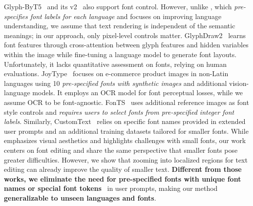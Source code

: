 Glyph-ByT5~\cite{liu2025glyph} and its v2~\cite{liu2024glyph} also support font control. However, unlike \cite{liu2025glyph}, which \textit{pre-specifies font labels for each language} and focuses on improving language understanding, we assume that text rendering is independent of the semantic meanings; in our approach, only pixel-level controls matter.
GlyphDraw2~\cite{ma2024glyphdraw2} learns font features through cross-attention between glyph features and hidden variables within the image while fine-tuning a language model to generate font layouts. Unfortunately, it lacks quantitative assessment on fonts, relying on human evaluations. 
JoyType~\cite{li2024joytype} focuses on e-commerce product images in non-Latin languages using 10 \textit{pre-specified fonts with synthetic images} and additional vision-language models. It employs an OCR model for font perceptual losses, while we assume OCR to be font-agnostic.
FonTS~\cite{shi2024fonts} uses additional reference images as font style controls and \textit{requires users to select fonts from pre-specified integer font labels}. Similarly, CustomText~\cite{paliwal2024customtext} relies on specific font names provided in extended user prompts and an additional training datasets tailored for smaller fonts.
While \citet{liu2024glyph} emphasizes visual aesthetics and highlights challenges with small fonts, our work centers on font editing and share the same perspective that smaller fonts pose greater difficulties. However, we show that zooming into localized regions for text editing can already improve the quality of smaller text.
\textbf{Different from those works, we eliminate the need for pre-specified fonts with unique font names or special font tokens}~\cite{liu2024glyph, shi2024fonts, paliwal2024customtext} in user prompts, making our method \textbf{generalizable to unseen languages and fonts}. 


